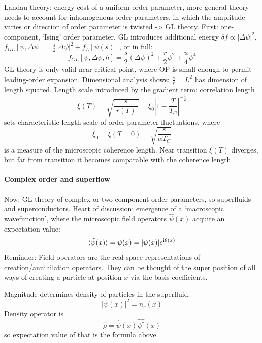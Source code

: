 \documentclass[../notes.tex]{subfiles}
\begin{document}
Landau theory: energy cost of a uniform order parameter, more general theory needs to account for inhomogenous order parameters, in which the amplitude varies or direction of order parameter is twisted -> GL theory.
First: one-component, `Ising' order parameter.
GL introduces additional energy \(\delta f \propto \vert \Delta \psi \vert^2\), \(f_{GL} [\psi, \Delta \psi] = \frac{s}{2} \vert \Delta \psi \vert^2 + f_L [\psi(s)]\), or in full:
\begin{equation}
	f_{GL} [\psi, \Delta \psi, h] = \frac{s}{2} (\Delta \psi)^2 + \frac{r}{2} \psi^2 + \frac{u}{4} \psi^4
\end{equation}
GL theory is only valid near critical point, where OP is small enough to permit leading-order expansion.
Dimensional analysis shows: \(\frac{s}{r} = L^2\) has dimension of length squared.
Length scale introduced by the gradient term: correlation length
\begin{equation}
	\xi (T) = \sqrt{\frac{s}{\vert r(T) \vert}} = \xi_0 \left\vert 1 - \frac{T}{T_C} \right\vert^{-\frac{1}{2}}
\end{equation}
sets characteristic length scale of order-parameter fluctuations, where
\begin{equation}
	\xi_0 = \xi (T = 0) = \sqrt{\frac{s}{\alpha T_C}}
\end{equation}
is a measure of the microscopic coherence length.
Near transition \(\xi (T)\) diverges, but far from transition it becomes comparable with the coherence length.

\paragraph{Complex order and superflow}

Now: GL theory of complex or two-component order parameters, so superfluids and superconductors.
Heart of discussion: emergence of a `macroscopic wavefunction', where the microscopic field operators \(\hat{\psi}(x)\) acquire an expectation value:
\begin{equation}
	\braket{\hat{\psi} (x)} = \psi (x) = \vert \psi (x) \vert e^{\mathrm{i} \theta(x)}
\end{equation}
Reminder: Field operators are the real space representations of creation/annihilation operators.
They can be thought of the super position of all ways of creating a particle at position \(x\) via the basis coefficients.

Magnitude determines density of particles in the superfluid:
\begin{equation}
	\vert \psi(x) \vert^2 = n_s (x)
\end{equation}
Density operator is
\begin{equation}
	\hat{\rho} = \hat{\psi} (x) \hat{\psi^{\dagger}} (x)
\end{equation}
so expectation value of that is the formula above.
\end{document}

